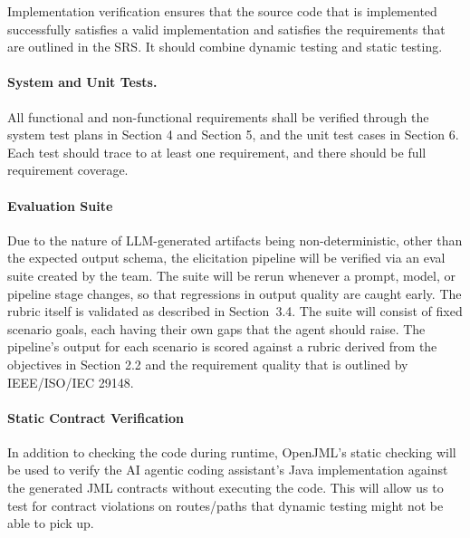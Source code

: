 \documentclass[12pt, titlepage]{article}
\begin{document}



Implementation verification ensures that the source code that is implemented successfully satisfies a valid implementation and satisfies the requirements that are outlined in the SRS. 
It should combine dynamic testing and static testing. 

\paragraph{System and Unit Tests.} 
All functional and non-functional requirements shall be verified through the system test plans in Section 4 and Section 5, and the unit test cases in Section 6. Each test should trace to at least one requirement, and there should be full requirement coverage. 

\paragraph{Evaluation Suite}
Due to the nature of LLM-generated artifacts being non-deterministic, other than the expected output schema, the elicitation pipeline will be verified via an eval suite created by the team. 
The suite will be rerun whenever a prompt, model, or pipeline stage changes, so that regressions in output quality are caught early. The rubric itself is validated as described in Section~3.4.
The suite will consist of fixed scenario goals, each having their own gaps that the agent should raise. The pipeline's output for each scenario is scored against a rubric derived from the objectives in Section 2.2 and the requirement quality that is outlined by IEEE/ISO/IEC 29148. 

\paragraph{Static Contract Verification}
In addition to checking the code during runtime, OpenJML's static checking will be used to verify the AI agentic coding assistant's Java implementation against the generated JML contracts without executing the code. 
This will allow us to test for contract violations on routes/paths that dynamic testing might not be able to pick up. 
\end{document}
